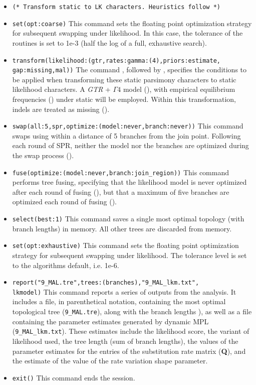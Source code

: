 \begin{itemize}
\item \texttt{(* Transform static to LK characters. Heuristics follow *)}
\item \texttt{set(opt:coarse)} This command sets the floating point optimization strategy for subsequent swapping
under likelihood. In this case, the tolerance of the routines is set to 1e-3 (half the log of a full, exhaustive search).
\item \texttt{transform(likelihood:(gtr,rates:gamma:(4),priors:estimate,\\gap:missing,mal))} The command 
, followed by , specifies the conditions to be applied when 
transforming these static parsimony characters to static likelihood characters.  
A \emph{GTR} + $\Gamma 4$ model (), 
with empirical equilibrium frequencies () under static  will be employed. 
Within this transformation, indels are treated as missing (). 
\item \texttt{swap(all:5,spr,optimize:(model:never,branch:never))} This command swaps using  
within a distance of 5 branches from the join point. Following each round of SPR, neither the model nor the branches 
are optimized during the swap process ().   
\item \texttt{fuse(optimize:(model:never,branch:join\_region))} This command performs tree fusing, specifying that 
the likelihood model is never optimized after each round of fusing (), but that 
a maximum of five branches are optimized each round of fusing (). 
\item \texttt{select(best:1)} This command saves a single most optimal topology (with branch lengths) in 
memory. All other trees are discarded from memory.
\item \texttt{set(opt:exhaustive)} This command sets the floating point optimization strategy for subsequent swapping
under likelihood. The tolerance level is set to the algorithms default, i.e. 1e-6. 
\item \texttt{report("9\_MAL.tre",trees:(branches),"9\_MAL\_lkm.txt",\\ lkmodel)} This command reports a series 
of outputs from the analysis. It includes a file, in parenthetical notation, containing the most optimal topological tree 
(\texttt{9\_MAL.tre}), along with the branch lengths {), as well as a file 
containing the parameter estimates generated by dynamic MPL (\texttt{9\_MAL\_lkm.txt}). These estimates include
the likelihood score, the variant of likelihood used, the tree length (sum of branch lengths), the values 
of the parameter estimates for the entries of the substitution rate matrix (\textbf{Q}), and the estimate of the value of 
the rate variation shape parameter.}
\item \texttt{exit()} This command ends the \poy session.
\end{itemize}

